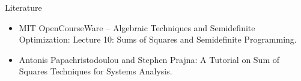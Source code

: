 \documentclass{beamer}
\begin{document}
\begin{frame}{Literature}

\begin{itemize}
	
	\item MIT OpenCourseWare -- Algebraic Techniques and Semidefinite Optimization:
	{Lecture 10: Sums of Squares and Semidefinite Programming.}
	
	\item Antonis Papachristodoulou and Stephen Prajna:
	{A Tutorial on Sum of Squares Techniques for Systems Analysis.}
	
	
\end{itemize}

\end{frame}



\myqrframe
\end{document}
